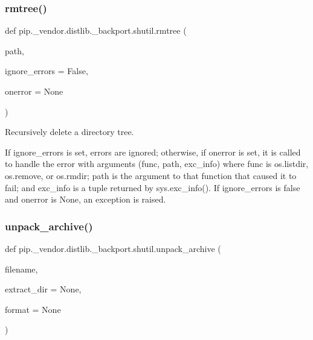 \subsubsection{\texorpdfstring{rmtree()}{rmtree()}}
{\footnotesize\ttfamily def pip.\+\_\+vendor.\+distlib.\+\_\+backport.\+shutil.\+rmtree (\begin{DoxyParamCaption}\item[{}]{path,  }\item[{}]{ignore\+\_\+errors = {\ttfamily False},  }\item[{}]{onerror = {\ttfamily None} }\end{DoxyParamCaption})}

\begin{DoxyVerb}Recursively delete a directory tree.

If ignore_errors is set, errors are ignored; otherwise, if onerror
is set, it is called to handle the error with arguments (func,
path, exc_info) where func is os.listdir, os.remove, or os.rmdir;
path is the argument to that function that caused it to fail; and
exc_info is a tuple returned by sys.exc_info().  If ignore_errors
is false and onerror is None, an exception is raised.\end{DoxyVerb}
 \mbox{\label{namespacepip_1_1__vendor_1_1distlib_1_1__backport_1_1shutil_a6944b8125b511c84213d186e05dd6187}} 
\subsubsection{\texorpdfstring{unpack\+\_\+archive()}{unpack\_archive()}}
{\footnotesize\ttfamily def pip.\+\_\+vendor.\+distlib.\+\_\+backport.\+shutil.\+unpack\+\_\+archive (\begin{DoxyParamCaption}\item[{}]{filename,  }\item[{}]{extract\+\_\+dir = {\ttfamily None},  }\item[{}]{format = {\ttfamily None} }\end{DoxyParamCaption})}

